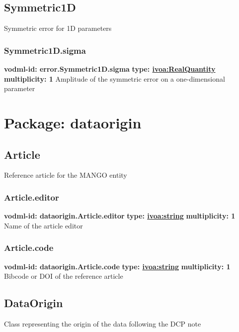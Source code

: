   \subsection{Symmetric1D}
    \label{sect:error.Symmetric1D}
    Symmetric error for 1D parameters

    \subsubsection{Symmetric1D.sigma}
    \textbf{vodml-id: error.Symmetric1D.sigma} \newline
    \textbf{type: \hyperref[sect:ivoa]{ivoa:RealQuantity}} \newline
    \textbf{multiplicity: 1} \newline
    Amplitude of the symmetric error on a one-dimensional parameter

\section{Package: dataorigin}

  \subsection{Article}
    \label{sect:dataorigin.Article}
    Reference article for the MANGO entity

    \subsubsection{Article.editor}
    \textbf{vodml-id: dataorigin.Article.editor} \newline
    \textbf{type: \hyperref[sect:ivoa]{ivoa:string}} \newline
    \textbf{multiplicity: 1} \newline
    Name of the article editor

    \subsubsection{Article.code}
    \textbf{vodml-id: dataorigin.Article.code} \newline
    \textbf{type: \hyperref[sect:ivoa]{ivoa:string}} \newline
    \textbf{multiplicity: 1} \newline
    Bibcode or DOI of the reference article

  \subsection{DataOrigin}
    \label{sect:dataorigin.DataOrigin}
    Class representing the origin of the data following the DCP note


